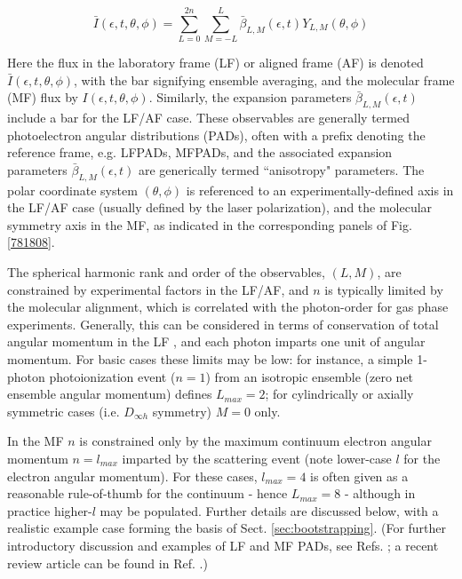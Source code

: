 \documentclass[10pt]{article}
\begin{document}
\begin{equation}
\bar{I}(\epsilon,t,\theta,\phi)=\sum_{L=0}^{2n}\sum_{M=-L}^{L}\bar{\beta}_{L,M}(\epsilon,t)Y_{L,M}(\theta,\phi)\label{eq:AF-PAD-general}
\end{equation}

Here the flux in the laboratory frame (LF) or aligned frame (AF) is denoted $\bar{I}(\epsilon,t,\theta,\phi)$, with the bar signifying ensemble averaging, and the molecular frame (MF) flux by $I(\epsilon,t,\theta,\phi)$.  Similarly, the expansion parameters $\bar{\beta}_{L,M}(\epsilon,t)$ include a bar for the LF/AF case. These observables are generally termed photoelectron angular distributions (PADs), often with a prefix denoting the reference frame, e.g. LFPADs, MFPADs, and the associated expansion parameters $\bar{\beta}_{L,M}(\epsilon,t)$ are generically termed ``anisotropy" parameters. The polar coordinate system $(\theta,\phi)$ is referenced to an experimentally-defined axis in the LF/AF case (usually defined by the laser polarization), and the molecular symmetry axis in the MF, as indicated in the corresponding panels of Fig. \ref{781808}. 

The spherical harmonic rank and order of the observables, $(L,M)$, are constrained by experimental factors in the LF/AF, and $n$ is typically limited by the molecular alignment, which is correlated with the photon-order for gas phase experiments. Generally, this can be considered in terms of conservation of total angular momentum in the LF \cite{Yang1948}, and each photon imparts one unit of angular momentum. For basic cases these limits may be low: for instance, a simple 1-photon photoionization event ($n=1$) from an isotropic ensemble (zero net ensemble angular momentum) defines $L_{max}=2$; for cylindrically or axially symmetric cases (i.e. $D_{\infty h}$ symmetry) $M=0$ only. 

In the MF $n$ is constrained only by the maximum continuum electron angular momentum $n=l_{max}$ imparted by the scattering event \cite{Dill1976} (note lower-case $l$ for the electron angular momentum). For these cases, $l_{max}=4$ is often given as a reasonable rule-of-thumb for the continuum - hence $L_{max}=8$ - although in practice higher-$l$ may be populated. Further details are discussed below, with a realistic example case forming the basis of Sect. \ref{sec:bootstrapping}. (For further introductory discussion and examples of LF and MF PADs, see Refs. \cite{Reid2003,hockett2018QMP1}; a recent review article can be found in Ref. \cite{dowek2022TrendsAngleresolvedMolecular}.)
\end{document}

